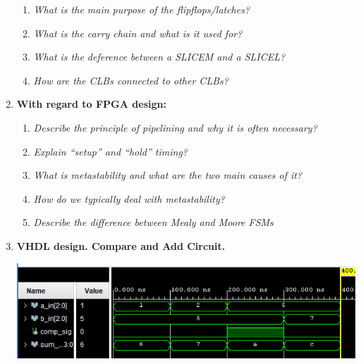 \documentclass[11pt]{article}
\begin{document}
\begin{preview}
\begin{enumerate}
\begin{enumerate}
    \item \textit{What is the main purpose of the flipflops/latches?}

    \item \textit{What is the carry chain and what is it used for?}

    \item \textit{What is the deference between a SLICEM and a SLICEL?}

    \item \textit{How are the CLBs connected to other CLBs?}

  \end{enumerate}

  \item \textbf{With regard to FPGA design:}
  \begin{enumerate}
    \item \textit{Describe the principle of pipelining and why it is often necessary?}
    
    \item \textit{Explain “setup” and “hold” timing?}

    \item \textit{What is metastability and what are the two main causes of it?}

    \item \textit{How do we typically deal with metastability?}

    \item \textit{Describe the difference between Mealy and Moore FSMs}

  \end{enumerate}

  \item \textbf{VHDL design. Compare and Add Circuit.}
  

  \includegraphics[width=\textwidth]{inc/sim.png}

  
  


\end{enumerate}
\end{preview}
\end{document}
